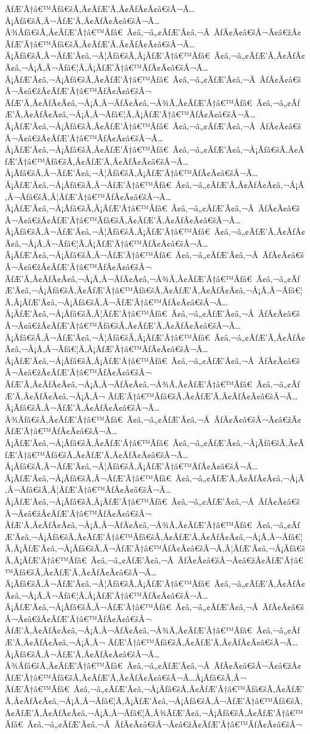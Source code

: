 \documentclass{gemoc} %
\begin{document}
ÃƒÆ’Ã†â€™Ãƒâ€šÃ‚Â¢ÃƒÆ’Ã‚Â¢ÃƒÂ¢Ã¢â€šÂ¬Ã…Â¡Ãƒâ€šÃ‚Â¬ÃƒÆ’Ã‚Â¢ÃƒÂ¢Ã¢â€šÂ¬Ã…Â¾Ãƒâ€šÃ‚Â¢ÃƒÆ’Ã†â€™Ãƒâ€ Ã¢â‚¬â„¢ÃƒÆ’Ã¢â‚¬Â ÃƒÂ¢Ã¢â€šÂ¬Ã¢â€žÂ¢ÃƒÆ’Ã†â€™Ãƒâ€šÃ‚Â¢ÃƒÆ’Ã‚Â¢ÃƒÂ¢Ã¢â€šÂ¬Ã…Â¡Ãƒâ€šÃ‚Â¬ÃƒÆ’Ã¢â‚¬Â¦Ãƒâ€šÃ‚Â¡ÃƒÆ’Ã†â€™Ãƒâ€ Ã¢â‚¬â„¢ÃƒÆ’Ã‚Â¢ÃƒÂ¢Ã¢â‚¬Å¡Ã‚Â¬Ãƒâ€¦Ã‚Â¡ÃƒÆ’Ã†â€™ÃƒÂ¢Ã¢â€šÂ¬Ã…Â¡ÃƒÆ’Ã¢â‚¬Å¡Ãƒâ€šÃ‚Â¢ÃƒÆ’Ã†â€™Ãƒâ€ Ã¢â‚¬â„¢ÃƒÆ’Ã¢â‚¬Â ÃƒÂ¢Ã¢â€šÂ¬Ã¢â€žÂ¢ÃƒÆ’Ã†â€™ÃƒÂ¢Ã¢â€šÂ¬ ÃƒÆ’Ã‚Â¢ÃƒÂ¢Ã¢â‚¬Å¡Ã‚Â¬ÃƒÂ¢Ã¢â‚¬Å¾Ã‚Â¢ÃƒÆ’Ã†â€™Ãƒâ€ Ã¢â‚¬â„¢ÃƒÆ’Ã‚Â¢ÃƒÂ¢Ã¢â‚¬Å¡Ã‚Â¬Ãƒâ€¦Ã‚Â¡ÃƒÆ’Ã†â€™ÃƒÂ¢Ã¢â€šÂ¬Ã…Â¡ÃƒÆ’Ã¢â‚¬Å¡Ãƒâ€šÃ‚Â¢ÃƒÆ’Ã†â€™Ãƒâ€ Ã¢â‚¬â„¢ÃƒÆ’Ã¢â‚¬Â ÃƒÂ¢Ã¢â€šÂ¬Ã¢â€žÂ¢ÃƒÆ’Ã†â€™ÃƒÂ¢Ã¢â€šÂ¬Ã…Â¡ÃƒÆ’Ã¢â‚¬Å¡Ãƒâ€šÃ‚Â¢ÃƒÆ’Ã†â€™Ãƒâ€ Ã¢â‚¬â„¢ÃƒÆ’Ã¢â‚¬Å¡Ãƒâ€šÃ‚Â¢ÃƒÆ’Ã†â€™Ãƒâ€šÃ‚Â¢ÃƒÆ’Ã‚Â¢ÃƒÂ¢Ã¢â€šÂ¬Ã…Â¡Ãƒâ€šÃ‚Â¬ÃƒÆ’Ã¢â‚¬Â¦Ãƒâ€šÃ‚Â¡ÃƒÆ’Ã†â€™ÃƒÂ¢Ã¢â€šÂ¬Ã…Â¡ÃƒÆ’Ã¢â‚¬Å¡Ãƒâ€šÃ‚Â¬ÃƒÆ’Ã†â€™Ãƒâ€ Ã¢â‚¬â„¢ÃƒÆ’Ã‚Â¢ÃƒÂ¢Ã¢â‚¬Å¡Ã‚Â¬Ãƒâ€šÃ‚Â¦ÃƒÆ’Ã†â€™ÃƒÂ¢Ã¢â€šÂ¬Ã…Â¡ÃƒÆ’Ã¢â‚¬Å¡Ãƒâ€šÃ‚Â¡ÃƒÆ’Ã†â€™Ãƒâ€ Ã¢â‚¬â„¢ÃƒÆ’Ã¢â‚¬Â ÃƒÂ¢Ã¢â€šÂ¬Ã¢â€žÂ¢ÃƒÆ’Ã†â€™Ãƒâ€šÃ‚Â¢ÃƒÆ’Ã‚Â¢ÃƒÂ¢Ã¢â€šÂ¬Ã…Â¡Ãƒâ€šÃ‚Â¬ÃƒÆ’Ã¢â‚¬Â¦Ãƒâ€šÃ‚Â¡ÃƒÆ’Ã†â€™Ãƒâ€ Ã¢â‚¬â„¢ÃƒÆ’Ã‚Â¢ÃƒÂ¢Ã¢â‚¬Å¡Ã‚Â¬Ãƒâ€¦Ã‚Â¡ÃƒÆ’Ã†â€™ÃƒÂ¢Ã¢â€šÂ¬Ã…Â¡ÃƒÆ’Ã¢â‚¬Å¡Ãƒâ€šÃ‚Â¬ÃƒÆ’Ã†â€™Ãƒâ€ Ã¢â‚¬â„¢ÃƒÆ’Ã¢â‚¬Â ÃƒÂ¢Ã¢â€šÂ¬Ã¢â€žÂ¢ÃƒÆ’Ã†â€™ÃƒÂ¢Ã¢â€šÂ¬ ÃƒÆ’Ã‚Â¢ÃƒÂ¢Ã¢â‚¬Å¡Ã‚Â¬ÃƒÂ¢Ã¢â‚¬Å¾Ã‚Â¢ÃƒÆ’Ã†â€™Ãƒâ€ Ã¢â‚¬â„¢ÃƒÆ’Ã¢â‚¬Å¡Ãƒâ€šÃ‚Â¢ÃƒÆ’Ã†â€™Ãƒâ€šÃ‚Â¢ÃƒÆ’Ã‚Â¢ÃƒÂ¢Ã¢â‚¬Å¡Ã‚Â¬Ãƒâ€¦Ã‚Â¡ÃƒÆ’Ã¢â‚¬Å¡Ãƒâ€šÃ‚Â¬ÃƒÆ’Ã†â€™ÃƒÂ¢Ã¢â€šÂ¬Ã…Â¡ÃƒÆ’Ã¢â‚¬Å¡Ãƒâ€šÃ‚Â¦ÃƒÆ’Ã†â€™Ãƒâ€ Ã¢â‚¬â„¢ÃƒÆ’Ã¢â‚¬Â ÃƒÂ¢Ã¢â€šÂ¬Ã¢â€žÂ¢ÃƒÆ’Ã†â€™Ãƒâ€šÃ‚Â¢ÃƒÆ’Ã‚Â¢ÃƒÂ¢Ã¢â€šÂ¬Ã…Â¡Ãƒâ€šÃ‚Â¬ÃƒÆ’Ã¢â‚¬Â¦Ãƒâ€šÃ‚Â¡ÃƒÆ’Ã†â€™Ãƒâ€ Ã¢â‚¬â„¢ÃƒÆ’Ã‚Â¢ÃƒÂ¢Ã¢â‚¬Å¡Ã‚Â¬Ãƒâ€¦Ã‚Â¡ÃƒÆ’Ã†â€™ÃƒÂ¢Ã¢â€šÂ¬Ã…Â¡ÃƒÆ’Ã¢â‚¬Å¡Ãƒâ€šÃ‚Â¡ÃƒÆ’Ã†â€™Ãƒâ€ Ã¢â‚¬â„¢ÃƒÆ’Ã¢â‚¬Â ÃƒÂ¢Ã¢â€šÂ¬Ã¢â€žÂ¢ÃƒÆ’Ã†â€™ÃƒÂ¢Ã¢â€šÂ¬ ÃƒÆ’Ã‚Â¢ÃƒÂ¢Ã¢â‚¬Å¡Ã‚Â¬ÃƒÂ¢Ã¢â‚¬Å¾Ã‚Â¢ÃƒÆ’Ã†â€™Ãƒâ€ Ã¢â‚¬â„¢ÃƒÆ’Ã‚Â¢ÃƒÂ¢Ã¢â‚¬Å¡Ã‚Â¬ ÃƒÆ’Ã†â€™Ãƒâ€šÃ‚Â¢ÃƒÆ’Ã‚Â¢ÃƒÂ¢Ã¢â€šÂ¬Ã…Â¡Ãƒâ€šÃ‚Â¬ÃƒÆ’Ã‚Â¢ÃƒÂ¢Ã¢â€šÂ¬Ã…Â¾Ãƒâ€šÃ‚Â¢ÃƒÆ’Ã†â€™Ãƒâ€ Ã¢â‚¬â„¢ÃƒÆ’Ã¢â‚¬Â ÃƒÂ¢Ã¢â€šÂ¬Ã¢â€žÂ¢ÃƒÆ’Ã†â€™ÃƒÂ¢Ã¢â€šÂ¬Ã…Â¡ÃƒÆ’Ã¢â‚¬Å¡Ãƒâ€šÃ‚Â¢ÃƒÆ’Ã†â€™Ãƒâ€ Ã¢â‚¬â„¢ÃƒÆ’Ã¢â‚¬Å¡Ãƒâ€šÃ‚Â¢ÃƒÆ’Ã†â€™Ãƒâ€šÃ‚Â¢ÃƒÆ’Ã‚Â¢ÃƒÂ¢Ã¢â€šÂ¬Ã…Â¡Ãƒâ€šÃ‚Â¬ÃƒÆ’Ã¢â‚¬Â¦Ãƒâ€šÃ‚Â¡ÃƒÆ’Ã†â€™ÃƒÂ¢Ã¢â€šÂ¬Ã…Â¡ÃƒÆ’Ã¢â‚¬Å¡Ãƒâ€šÃ‚Â¬ÃƒÆ’Ã†â€™Ãƒâ€ Ã¢â‚¬â„¢ÃƒÆ’Ã‚Â¢ÃƒÂ¢Ã¢â‚¬Å¡Ã‚Â¬Ãƒâ€šÃ‚Â¦ÃƒÆ’Ã†â€™ÃƒÂ¢Ã¢â€šÂ¬Ã…Â¡ÃƒÆ’Ã¢â‚¬Å¡Ãƒâ€šÃ‚Â¡ÃƒÆ’Ã†â€™Ãƒâ€ Ã¢â‚¬â„¢ÃƒÆ’Ã¢â‚¬Â ÃƒÂ¢Ã¢â€šÂ¬Ã¢â€žÂ¢ÃƒÆ’Ã†â€™ÃƒÂ¢Ã¢â€šÂ¬ ÃƒÆ’Ã‚Â¢ÃƒÂ¢Ã¢â‚¬Å¡Ã‚Â¬ÃƒÂ¢Ã¢â‚¬Å¾Ã‚Â¢ÃƒÆ’Ã†â€™Ãƒâ€ Ã¢â‚¬â„¢ÃƒÆ’Ã¢â‚¬Å¡Ãƒâ€šÃ‚Â¢ÃƒÆ’Ã†â€™Ãƒâ€šÃ‚Â¢ÃƒÆ’Ã‚Â¢ÃƒÂ¢Ã¢â‚¬Å¡Ã‚Â¬Ãƒâ€¦Ã‚Â¡ÃƒÆ’Ã¢â‚¬Å¡Ãƒâ€šÃ‚Â¬ÃƒÆ’Ã†â€™ÃƒÂ¢Ã¢â€šÂ¬Ã‚Â¦ÃƒÆ’Ã¢â‚¬Å¡Ãƒâ€šÃ‚Â¡ÃƒÆ’Ã†â€™Ãƒâ€ Ã¢â‚¬â„¢ÃƒÆ’Ã¢â‚¬Â ÃƒÂ¢Ã¢â€šÂ¬Ã¢â€žÂ¢ÃƒÆ’Ã†â€™Ãƒâ€šÃ‚Â¢ÃƒÆ’Ã‚Â¢ÃƒÂ¢Ã¢â€šÂ¬Ã…Â¡Ãƒâ€šÃ‚Â¬ÃƒÆ’Ã¢â‚¬Â¦Ãƒâ€šÃ‚Â¡ÃƒÆ’Ã†â€™Ãƒâ€ Ã¢â‚¬â„¢ÃƒÆ’Ã‚Â¢ÃƒÂ¢Ã¢â‚¬Å¡Ã‚Â¬Ãƒâ€¦Ã‚Â¡ÃƒÆ’Ã†â€™ÃƒÂ¢Ã¢â€šÂ¬Ã…Â¡ÃƒÆ’Ã¢â‚¬Å¡Ãƒâ€šÃ‚Â¬ÃƒÆ’Ã†â€™Ãƒâ€ Ã¢â‚¬â„¢ÃƒÆ’Ã¢â‚¬Â ÃƒÂ¢Ã¢â€šÂ¬Ã¢â€žÂ¢ÃƒÆ’Ã†â€™ÃƒÂ¢Ã¢â€šÂ¬ ÃƒÆ’Ã‚Â¢ÃƒÂ¢Ã¢â‚¬Å¡Ã‚Â¬ÃƒÂ¢Ã¢â‚¬Å¾Ã‚Â¢ÃƒÆ’Ã†â€™Ãƒâ€ Ã¢â‚¬â„¢ÃƒÆ’Ã‚Â¢ÃƒÂ¢Ã¢â‚¬Å¡Ã‚Â¬ ÃƒÆ’Ã†â€™Ãƒâ€šÃ‚Â¢ÃƒÆ’Ã‚Â¢ÃƒÂ¢Ã¢â€šÂ¬Ã…Â¡Ãƒâ€šÃ‚Â¬ÃƒÆ’Ã‚Â¢ÃƒÂ¢Ã¢â€šÂ¬Ã…Â¾Ãƒâ€šÃ‚Â¢ÃƒÆ’Ã†â€™Ãƒâ€ Ã¢â‚¬â„¢ÃƒÆ’Ã¢â‚¬Â ÃƒÂ¢Ã¢â€šÂ¬Ã¢â€žÂ¢ÃƒÆ’Ã†â€™Ãƒâ€šÃ‚Â¢ÃƒÆ’Ã‚Â¢ÃƒÂ¢Ã¢â€šÂ¬Ã…Â¡Ãƒâ€šÃ‚Â¬ ÃƒÆ’Ã†â€™Ãƒâ€ Ã¢â‚¬â„¢ÃƒÆ’Ã¢â‚¬Å¡Ãƒâ€šÃ‚Â¢ÃƒÆ’Ã†â€™Ãƒâ€šÃ‚Â¢ÃƒÆ’Ã‚Â¢ÃƒÂ¢Ã¢â‚¬Å¡Ã‚Â¬Ãƒâ€¦Ã‚Â¡ÃƒÆ’Ã¢â‚¬Å¡Ãƒâ€šÃ‚Â¬ÃƒÆ’Ã†â€™Ãƒâ€šÃ‚Â¢ÃƒÆ’Ã‚Â¢ÃƒÂ¢Ã¢â‚¬Å¡Ã‚Â¬Ãƒâ€¦Ã‚Â¾ÃƒÆ’Ã¢â‚¬Å¡Ãƒâ€šÃ‚Â¢ÃƒÆ’Ã†â€™Ãƒâ€ Ã¢â‚¬â„¢ÃƒÆ’Ã¢â‚¬Â ÃƒÂ¢Ã¢â€šÂ¬Ã¢â€žÂ¢ÃƒÆ’Ã†â€™ÃƒÂ¢Ã¢â€šÂ¬ 
\end{document}
